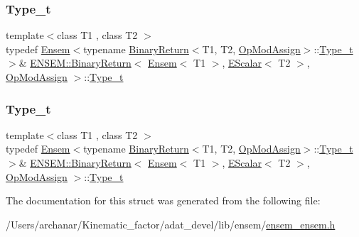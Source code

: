 \subsubsection{\texorpdfstring{Type\_t}{Type\_t}\hspace{0.1cm}{\footnotesize\ttfamily [1/2]}}
{\footnotesize\ttfamily template$<$class T1 , class T2 $>$ \\
typedef \mbox{\hyperlink{classENSEM_1_1Ensem}{Ensem}}$<$typename \mbox{\hyperlink{structENSEM_1_1BinaryReturn}{Binary\+Return}}$<$T1, T2, \mbox{\hyperlink{structENSEM_1_1OpModAssign}{Op\+Mod\+Assign}}$>$\+::\mbox{\hyperlink{structENSEM_1_1BinaryReturn_3_01Ensem_3_01T1_01_4_00_01EScalar_3_01T2_01_4_00_01OpModAssign_01_4_ae79bfed41fd3b8579919621da1f79095}{Type\+\_\+t}}$>$\& \mbox{\hyperlink{structENSEM_1_1BinaryReturn}{E\+N\+S\+E\+M\+::\+Binary\+Return}}$<$ \mbox{\hyperlink{classENSEM_1_1Ensem}{Ensem}}$<$ T1 $>$, \mbox{\hyperlink{classENSEM_1_1EScalar}{E\+Scalar}}$<$ T2 $>$, \mbox{\hyperlink{structENSEM_1_1OpModAssign}{Op\+Mod\+Assign}} $>$\+::\mbox{\hyperlink{structENSEM_1_1BinaryReturn_3_01Ensem_3_01T1_01_4_00_01EScalar_3_01T2_01_4_00_01OpModAssign_01_4_ae79bfed41fd3b8579919621da1f79095}{Type\+\_\+t}}}

\mbox{\label{structENSEM_1_1BinaryReturn_3_01Ensem_3_01T1_01_4_00_01EScalar_3_01T2_01_4_00_01OpModAssign_01_4_ae79bfed41fd3b8579919621da1f79095}} 
\subsubsection{\texorpdfstring{Type\_t}{Type\_t}\hspace{0.1cm}{\footnotesize\ttfamily [2/2]}}
{\footnotesize\ttfamily template$<$class T1 , class T2 $>$ \\
typedef \mbox{\hyperlink{classENSEM_1_1Ensem}{Ensem}}$<$typename \mbox{\hyperlink{structENSEM_1_1BinaryReturn}{Binary\+Return}}$<$T1, T2, \mbox{\hyperlink{structENSEM_1_1OpModAssign}{Op\+Mod\+Assign}}$>$\+::\mbox{\hyperlink{structENSEM_1_1BinaryReturn_3_01Ensem_3_01T1_01_4_00_01EScalar_3_01T2_01_4_00_01OpModAssign_01_4_ae79bfed41fd3b8579919621da1f79095}{Type\+\_\+t}}$>$\& \mbox{\hyperlink{structENSEM_1_1BinaryReturn}{E\+N\+S\+E\+M\+::\+Binary\+Return}}$<$ \mbox{\hyperlink{classENSEM_1_1Ensem}{Ensem}}$<$ T1 $>$, \mbox{\hyperlink{classENSEM_1_1EScalar}{E\+Scalar}}$<$ T2 $>$, \mbox{\hyperlink{structENSEM_1_1OpModAssign}{Op\+Mod\+Assign}} $>$\+::\mbox{\hyperlink{structENSEM_1_1BinaryReturn_3_01Ensem_3_01T1_01_4_00_01EScalar_3_01T2_01_4_00_01OpModAssign_01_4_ae79bfed41fd3b8579919621da1f79095}{Type\+\_\+t}}}



The documentation for this struct was generated from the following file\+:\begin{DoxyCompactItemize}
\item 
/\+Users/archanar/\+Kinematic\+\_\+factor/adat\+\_\+devel/lib/ensem/\mbox{\hyperlink{lib_2ensem_2ensem__ensem_8h}{ensem\+\_\+ensem.\+h}}\end{DoxyCompactItemize}
